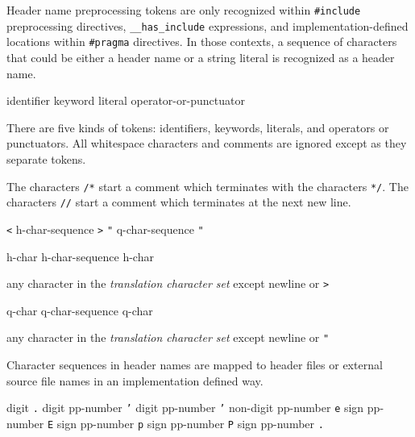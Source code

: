 \p Header name preprocessing tokens are only recognized within
\texttt{\#include} preprocessing directives, \texttt{\_\_has\_include} expressions,
and implementation-defined locations within \texttt{\#pragma} directives. In
those contexts, a sequence of characters that could be either a header name or a
string literal is recognized as a header name.


\begin{grammar}
  \br
  identifier\br
  keyword\br
  literal\br
  operator-or-punctuator
\end{grammar}

\p There are five kinds of tokens: identifiers, keywords, literals, and
operators or punctuators. All whitespace characters and comments are ignored
except as they separate tokens.


\p The characters \texttt{/*} start a comment which terminates with the
characters \texttt{*/}. The characters \texttt{//} start a comment
which terminates at the next new line.


\begin{grammar}
  \br
  \texttt{<} h-char-sequence \texttt{>}\br
  \texttt{"} q-char-sequence \texttt{"}

  \br
  h-char\br
  h-char-sequence h-char

  \br
  \textnormal{any character in the \textit{translation character set} except
  newline or \texttt{>}}

  \br
  q-char\br
  q-char-sequence q-char

  \br
  \textnormal{any character in the \textit{translation character set} except
  newline or \texttt{"}}
\end{grammar}

\p Character sequences in header names are mapped to header files or external
source file names in an implementation defined way.


\begin{grammar}
  \br
  digit\br
  \texttt{.} digit\br
  pp-number \texttt{'} digit\br
  pp-number \texttt{'} non-digit\br
  pp-number \texttt{e} sign\br
  pp-number \texttt{E} sign\br
  pp-number \texttt{p} sign\br
  pp-number \texttt{P} sign\br
  pp-number \texttt{.}
\end{grammar}

